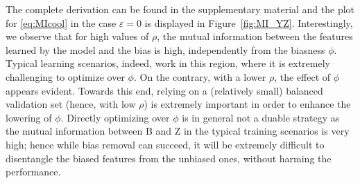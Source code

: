 The complete derivation can be found in the supplementary material %
and the plot for \eqref{eq:MIcool} in the case $\varepsilon=0$ is displayed in Figure~\ref{fig:MI_YZ}. 
Interestingly, we observe that for high values of $\rho$, the mutual information between the features
learned by the model and the bias is high, independently from the biasness $\phi$.
Typical learning scenarios, indeed, work in this region, where it is extremely challenging to optimize over $\phi$. On the contrary, with a lower $\rho$, the effect of $\phi$ appears evident. Towards this end, relying on a (relatively small) balanced validation set (hence, with low $\rho$) is extremely important in order to enhance the lowering of $\phi$. Directly optimizing over $\phi$ is in general not a duable strategy as the mutual information between B and Z in the typical training scenarios is very high; hence while bias removal can succeed, it will be extremely difficult to disentangle the biased features from the unbiased ones, without harming the performance.









